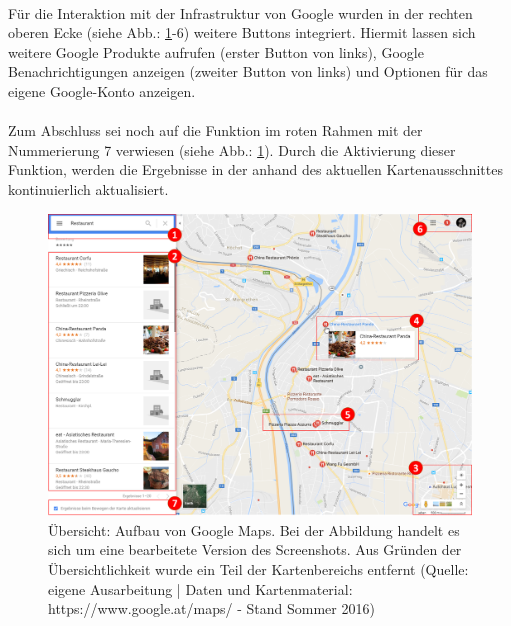 \documentclass[../Bachelorarbeit.tex]{subfiles}
\begin{document}
\\
Für die Interaktion mit der Infrastruktur von Google wurden in der rechten oberen Ecke (siehe Abb.: \ref{fig:googlemapOverview}-6) weitere Buttons integriert.
Hiermit lassen sich weitere Google Produkte aufrufen (erster Button von links), Google Benachrichtigungen anzeigen (zweiter Button von links) und Optionen für das eigene Google-Konto anzeigen.\\
\\
Zum Abschluss sei noch auf die Funktion im roten Rahmen mit der Nummerierung 7 verwiesen (siehe Abb.: \ref{fig:googlemapOverview}). 
Durch die Aktivierung dieser Funktion, werden die Ergebnisse in der  anhand des aktuellen Kartenausschnittes kontinuierlich aktualisiert.

\begin{figure}[H]
\centering
\includegraphics[width=1\linewidth]{img/StandDerTechnik/googlemapOverview}
\caption[Übersicht: Aufbau von Google Maps]{Übersicht: Aufbau von Google Maps. Bei der Abbildung handelt es sich um eine bearbeitete Version des Screenshots. Aus Gründen der Übersichtlichkeit wurde ein Teil der Kartenbereichs entfernt (Quelle: eigene Ausarbeitung | Daten und Kartenmaterial: https://www.google.at/maps/ - Stand Sommer 2016)}
\label{fig:googlemapOverview}
\end{figure}
\end{document}
